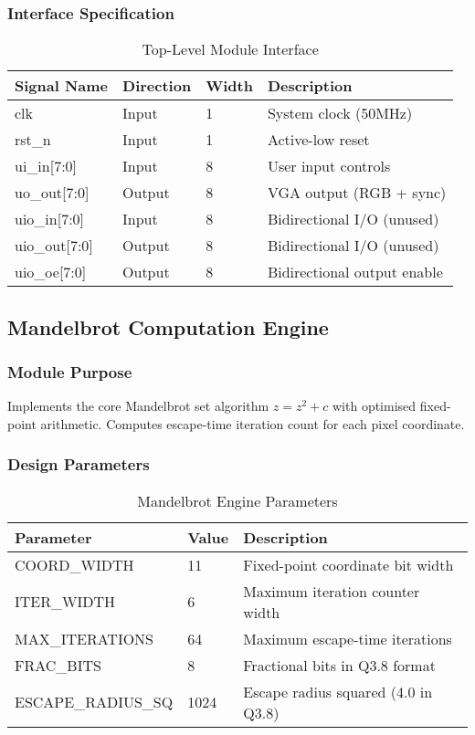 \documentclass[11pt,a4paper]{article}
\begin{document}
\subsubsection{Interface Specification}
\begin{table}[h]
\centering
\begin{tabularx}{\textwidth}{|l|l|l|X|}
\hline
\rowcolor{darkblue!20}
\textbf{Signal Name} & \textbf{Direction} & \textbf{Width} & \textbf{Description} \\
\hline
clk & Input & 1 & System clock (50MHz) \\
rst\_n & Input & 1 & Active-low reset \\
ui\_in[7:0] & Input & 8 & User input controls \\
uo\_out[7:0] & Output & 8 & VGA output (RGB + sync) \\
uio\_in[7:0] & Input & 8 & Bidirectional I/O (unused) \\
uio\_out[7:0] & Output & 8 & Bidirectional I/O (unused) \\
uio\_oe[7:0] & Output & 8 & Bidirectional output enable \\
\hline
\end{tabularx}
\caption{Top-Level Module Interface}
\end{table}

\subsection{Mandelbrot Computation Engine}

\subsubsection{Module Purpose}
Implements the core Mandelbrot set algorithm $z = z^2 + c$ with optimised fixed-point arithmetic. Computes escape-time iteration count for each pixel coordinate.

\subsubsection{Design Parameters}
\begin{table}[h]
\centering
\begin{tabularx}{\textwidth}{|l|l|X|}
\hline
\rowcolor{darkred!20}
\textbf{Parameter} & \textbf{Value} & \textbf{Description} \\
\hline
COORD\_WIDTH & 11 & Fixed-point coordinate bit width \\
ITER\_WIDTH & 6 & Maximum iteration counter width \\
MAX\_ITERATIONS & 64 & Maximum escape-time iterations \\
FRAC\_BITS & 8 & Fractional bits in Q3.8 format \\
ESCAPE\_RADIUS\_SQ & 1024 & Escape radius squared (4.0 in Q3.8) \\
\hline
\end{tabularx}
\caption{Mandelbrot Engine Parameters}
\end{table}
\end{document}
